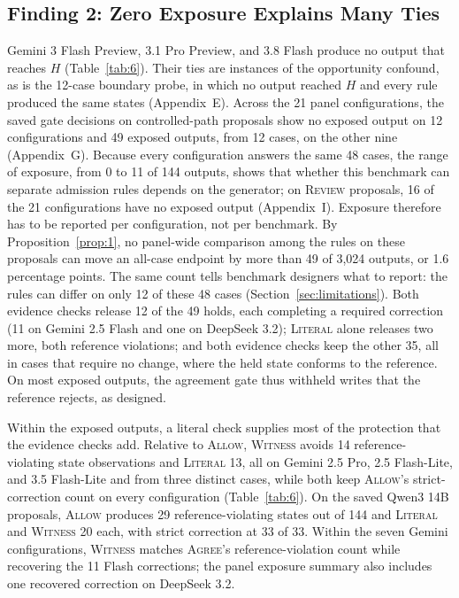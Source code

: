 \documentclass[acmsmall,review]{acmart}
\newcommand{\agree}{\textsc{Agree}}
\newcommand{\allow}{\textsc{Allow}}
\newcommand{\literal}{\textsc{Literal}}
\newcommand{\witness}{\textsc{Witness}}
\newcommand{\review}{\textsc{Review}}
\begin{document}
\subsection{Finding 2: Zero Exposure Explains Many Ties}\label{sec:exposure-results}
Gemini 3 Flash Preview, 3.1 Pro Preview, and 3.8 Flash produce no output that reaches $H$ (Table~\ref{tab:6}). Their ties are instances of the opportunity confound, as is the 12-case boundary probe, in which no output reached $H$ and every rule produced the same states (Appendix~E). Across the 21 panel configurations, the saved gate decisions on controlled-path proposals show no exposed output on 12 configurations and 49 exposed outputs, from 12 cases, on the other nine (Appendix~G). Because every configuration answers the same 48 cases, the range of exposure, from 0 to 11 of 144 outputs, shows that whether this benchmark can separate admission rules depends on the generator; on \review{} proposals, 16 of the 21 configurations have no exposed output (Appendix~I). Exposure therefore has to be reported per configuration, not per benchmark. By Proposition~\ref{prop:1}, no panel-wide comparison among the rules on these proposals can move an all-case endpoint by more than 49 of 3,024 outputs, or 1.6 percentage points. The same count tells benchmark designers what to report: the rules can differ on only 12 of these 48 cases (Section~\ref{sec:limitations}). Both evidence checks release 12 of the 49 holds, each completing a required correction (11 on Gemini 2.5 Flash and one on DeepSeek 3.2); \literal{} alone releases two more, both reference violations; and both evidence checks keep the other 35, all in cases that require no change, where the held state conforms to the reference. On most exposed outputs, the agreement gate thus withheld writes that the reference rejects, as designed.

Within the exposed outputs, a literal check supplies most of the protection that the evidence checks add. Relative to \allow{}, \witness{} avoids 14 reference-violating state observations and \literal{} 13, all on Gemini 2.5 Pro, 2.5 Flash-Lite, and 3.5 Flash-Lite and from three distinct cases, while both keep \allow{}'s strict-correction count on every configuration (Table~\ref{tab:6}). On the saved Qwen3 14B proposals, \allow{} produces 29 reference-violating states out of 144 and \literal{} and \witness{} 20 each, with strict correction at 33 of 33. Within the seven Gemini configurations, \witness{} matches \agree{}'s reference-violation count while recovering the 11 Flash corrections; the panel exposure summary also includes one recovered correction on DeepSeek 3.2.
\end{document}
